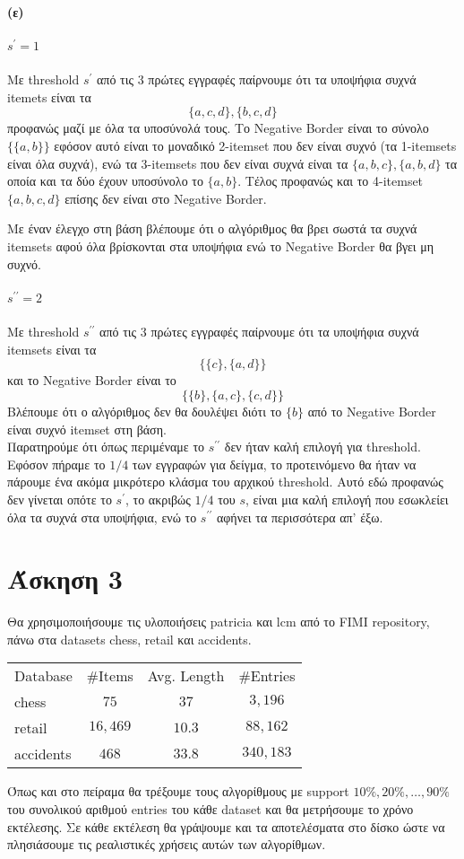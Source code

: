 \documentclass[a4paper,11pt]{article}
\begin{document}
\paragraph{(ε)}
\subparagraph{$s^\prime=1$} Με threshold $s^\prime$ από τις 3 πρώτες εγγραφές παίρνουμε ότι τα υποψήφια συχνά itemets είναι τα
\[ \{a,c,d\},\{b,c,d\} \]
προφανώς μαζί με όλα τα υποσύνολά τους.
Το Negative Border είναι το σύνολο $\{ \{a,b\} \}$ εφόσον αυτό είναι το μοναδικό 2-itemset που δεν είναι συχνό (τα 1-itemsets είναι όλα συχνά), ενώ τα 3-itemsets που δεν είναι συχνά είναι τα $\{a,b,c\},\{a,b,d\}$ τα οποία και τα δύο έχουν υποσύνολο το $\{a,b\}$.
Τέλος προφανώς και το 4-itemset $\{a,b,c,d\}$ επίσης δεν είναι στο Negative Border.

Με έναν έλεγχο στη βάση βλέπουμε ότι ο αλγόριθμος θα βρει σωστά τα συχνά itemsets αφού όλα βρίσκονται στα υποψήφια ενώ το Negative Border θα βγει μη συχνό.

\subparagraph{$s^{\prime\prime}=2$} Με threshold $s^{\prime\prime}$ από τις 3 πρώτες εγγραφές παίρνουμε ότι τα υποψήφια συχνά itemsets είναι τα
\[ \{ \{c\},\{a,d\} \} \]
και το Negative Border είναι το
\[ \{ \{b\},\{a,c\},\{c,d\} \} \]
Βλέπουμε ότι ο αλγόριθμος δεν θα δουλέψει διότι το $\{b\}$ από το Negative Border είναι συχνό itemset στη βάση.
\\[8pt]
Παρατηρούμε ότι όπως περιμέναμε το $s^{\prime\prime}$ δεν ήταν καλή επιλογή για threshold.
Εφόσον πήραμε το $1/4$ των εγγραφών για δείγμα, το προτεινόμενο θα ήταν να πάρουμε ένα ακόμα μικρότερο κλάσμα του αρχικού threshold.
Αυτό εδώ προφανώς δεν γίνεται οπότε το $s^\prime$, το ακριβώς $1/4$ του $s$, είναι μια καλή επιλογή που εσωκλείει όλα τα συχνά στα υποψήφια, ενώ το $s^{\prime\prime}$ αφήνει τα περισσότερα απ' έξω.

\section*{Άσκηση 3}

Θα χρησιμοποιήσουμε τις υλοποιήσεις patricia και lcm από το FIMI repository, πάνω στα datasets chess, retail και accidents.
\begin{center}
	\begin{tabular}{| l | c | c | c |}
		\hline
		Database & \#Items & Avg. Length & \#Entries \\ \hhline{|=|=|=|=|}
		chess & $75$ & $37$ & $3,196$ \\ \hline
		retail & $16,469$ & $10.3$ & $88,162$ \\ \hline
		accidents & $468$ & $33.8$ & $340,183$ \\ \hline
	\end{tabular}
\end{center}
Όπως και στο πείραμα θα τρέξουμε τους αλγορίθμους με support $10\%, 20\%, \dots,90\%$ του συνολικού αριθμού entries του κάθε dataset και θα μετρήσουμε το χρόνο εκτέλεσης.
Σε κάθε εκτέλεση θα γράψουμε και τα αποτελέσματα στο δίσκο ώστε να πλησιάσουμε τις ρεαλιστικές χρήσεις αυτών των αλγορίθμων.
\end{document}
